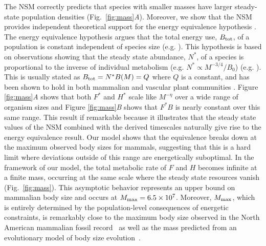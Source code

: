 \documentclass{pnastwo}
\begin{document}
\begin{article}
The NSM correctly predicts that species with smaller masses have larger steady-state population densities (Fig.~\ref{fig:mass}\emph{A}).
Moreover, we show that the NSM provides independent theoretical support for the energy equivalence hypothesis \cite{allen2002,enquist1998}.
The energy equivalence hypothesis argues that the total energy use, $B_{\rm tot}$, of a population is constant independent of species size (e.g. \cite{allen2002,enquist1998}). %
This hypothesis is based on observations showing that the steady state abundance, $N^*$, of a species is proportional to the inverse of individual metabolism (e.g. $N^*\propto M^{-3/4}/B_{0}$)  (e.g. \cite{allen2002,enquist1998}).
This is usually stated as $B_{\rm tot}=N^*B(M)=Q$ where $Q$ is a constant, and has been shown to hold in both mammalian and vascular plant communities \cite{allen2002,enquist1998}.
Figure \ref{fig:mass}\emph{A} shows that both $F^{*}$ and $H^{*}$ scale like $M^{-\eta}$ over a wide range of organism sizes and Figure \ref{fig:mass}\emph{B} shows that $F^{*}B$ is nearly constant over this same range.
This result if remarkable because it illustrates that the steady state values of the NSM combined with the derived timescales naturally give rise to the energy equivalence result.
Our model shows that the equivalence breaks down at the maximum observed body sizes for mammals, suggesting that this is a hard limit where deviations outside of this range are energetically suboptimal. %
In the framework of our model, the total metabolic rate of $F$ and $H$ becomes infinite at a finite mass, occurring at the same scale where the steady state resources vanish (Fig.~\ref{fig:mass}). This asymptotic behavior represents an upper bound on mammalian body size and occurs at $M_{\rm max}=6.5\times10^7$.
Moreover, $M_{\rm max}$, which is entirely determined by the population-level consequences of energetic constraints, is remarkably close to the maximum body size observed in the North American mammalian fossil record~\cite{Alroy:1998p1594} as well as the mass predicted from an evolutionary model of body size evolution~\cite{Clauset:2009fh}.



\end{article}
\end{document}
